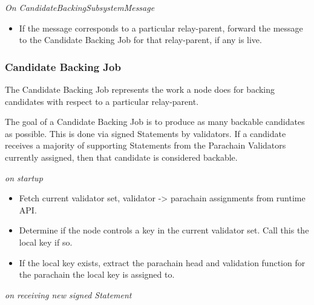 \textit{On CandidateBackingSubsystemMessage}

\begin{itemize}
    \item If the message corresponds to a particular relay-parent, forward the
    message to the Candidate Backing Job for that relay-parent, if any is live.
\end{itemize}


\subsubsection{Candidate Backing Job}

The Candidate Backing Job represents the work a node does for backing candidates
with respect to a particular relay-parent.
\newline

The goal of a Candidate Backing Job is to produce as many backable candidates as
possible. This is done via signed Statements by validators. If a candidate
receives a majority of supporting Statements from the Parachain Validators
currently assigned, then that candidate is considered backable.
\newline

\textit{on startup}

\begin{itemize}
    \item Fetch current validator set, validator -> parachain assignments from
    runtime API.
    \item Determine if the node controls a key in the current validator set.
    Call this the local key if so.
    \item If the local key exists, extract the parachain head and validation
    function for the parachain the local key is assigned to.
\end{itemize}

\textit{on receiving new signed Statement}

